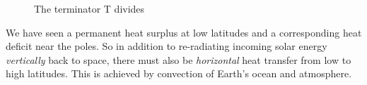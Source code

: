\begin{figure}
\begin{center}
	\caption{The terminator T divides }
	\label{insol}
  	\end{center}
	\end{figure}

We have seen a permanent heat surplus at low latitudes and a corresponding heat deficit near the poles. So in addition to re-radiating incoming solar energy \emph{vertically} back to space, there must also be \emph{horizontal} heat transfer from low to high latitudes. This is achieved by convection of Earth's ocean and atmosphere.